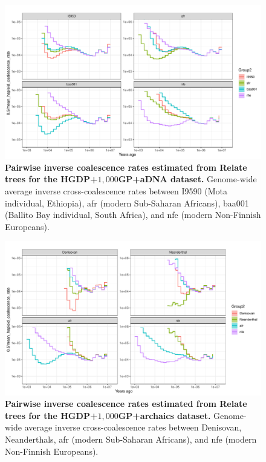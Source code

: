 \begin{figure}
    \centering
    \includegraphics[width=\textwidth]{figures/gb_pairwise_coal/gb_pairwise_coal_hgdp_1gp_adna.pdf}
    \caption{\textbf{Pairwise inverse coalescence rates estimated from Relate trees for the HGDP+$1{,}000$GP+aDNA dataset.} Genome-wide average inverse cross-coalescence rates between I9590 (Mota individual, Ethiopia), afr (modern Sub-Saharan Africans), baa001 (Ballito Bay individual, South Africa), and nfe (modern Non-Finnish Europeans).}
    \label{fig:gb_pairwise_coal_hgdp_1gp_adna}
\end{figure}

\begin{figure}
    \centering
    \includegraphics[width=\textwidth]{figures/gb_pairwise_coal/gb_pairwise_coal_hgdp_1gp_archaic.pdf}
    \caption{\textbf{Pairwise inverse coalescence rates estimated from Relate trees for the HGDP+$1{,}000$GP+archaics dataset.} Genome-wide average inverse cross-coalescence rates between Denisovan, Neanderthals, afr (modern Sub-Saharan Africans), and nfe (modern Non-Finnish Europeans).}
    \label{fig:gb_pairwise_coal_hgdp_1gp_archaic}
\end{figure}

